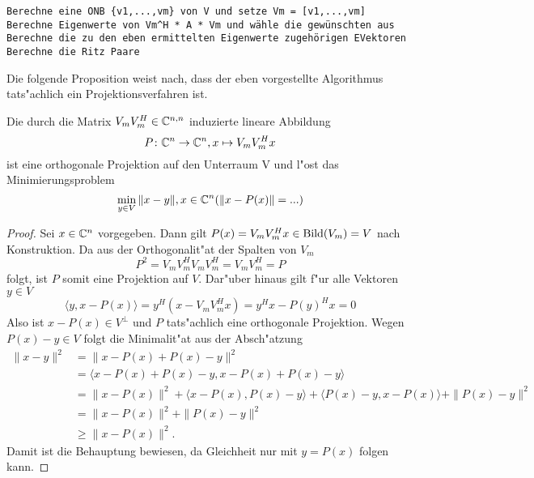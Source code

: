\begin{lstlisting}[caption = Rayleigh-Ritz-Verfahren (Vgl. Saad Algo. 4.5), captionpos=b]
Berechne eine ONB {v1,...,vm} von V und setze Vm = [v1,...,vm]
Berechne Eigenwerte von Vm^H * A * Vm und wähle die gewünschten aus
Berechne die zu den eben ermittelten Eigenwerte zugehörigen EVektoren
Berechne die Ritz Paare
\end{lstlisting}

Die folgende Proposition weist nach, dass der eben vorgestellte Algorithmus tats"achlich
ein Projektionsverfahren ist.

\begin{prop}\label{prop:projektor}
Die durch die Matrix $V_m V_m^H \in \mathbb{C}^{n,n}$ induzierte lineare Abbildung
\[
P\colon \mathbb{C}^n \to \mathbb{C}^n, x\mapsto V_m V_m^H x
\]
ist eine orthogonale Projektion auf den Unterraum V und l"ost das Minimierungsproblem
\[
\min_{y\in V}\|x-y\|, x\in\mathbb{C}^n (\|x-P(x)\| = ...)
\]
\end{prop}

\begin{proof}
Sei $x\in\mathbb{C}^n$ vorgegeben. Dann gilt $P(x) = V_m V_m^H x \in \operatorname{Bild}(V_m) = V$ nach Konstruktion.
Da aus der Orthogonalit"at der Spalten von $V_m$
\[
P^2 = V_m V_m^H V_m V_m^H = V_m V_m^H = P
\]
folgt, ist $P$ somit eine Projektion auf $V$. Dar"uber hinaus gilt f"ur alle
Vektoren $y\in V$
\[
\langle y, x-P(x)\rangle = y^H (x - V_m V_m^H x) = y^H x - P(y)^H x = 0
\]
Also ist $x-P(x) \in V^{\bot}$ und $P$ tats"achlich eine orthogonale Projektion.
Wegen $P(x)-y \in V$ folgt die Minimalit"at aus der Absch"atzung
\begin{align*}
\|x-y\|^2 &= \|x-P(x) + P(x)-y\|^2 \\
&= \langle x-P(x) + P(x)-y, x-P(x) + P(x)-y \rangle \\
&= \|x-P(x)\|^2 + \langle x-P(x), P(x)-y \rangle + \langle P(x)-y, x-P(x)\rangle + \|P(x)-y\|^2 \\
&= \|x - P(x)\|^2 + \| P(x)-y \|^2\\
&\ge \|x-P(x)\|^2.
\end{align*}
Damit ist die Behauptung bewiesen, da Gleichheit nur mit $y=P(x)$ folgen kann.
\end{proof}

